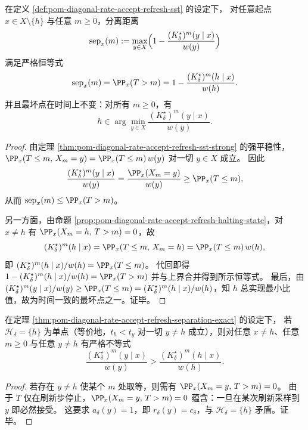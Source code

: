 \begin{theorem}[精确分离距离与时间一致的最坏点]\label{thm:pom-diagonal-rate-accept-refresh-separation-exact}
在定义 \ref{def:pom-diagonal-rate-accept-refresh-sst} 的设定下，
对任意起点 \(x\in X\setminus\{h\}\) 与任意 \(m\ge 0\)，分离距离
\[
\mathrm{sep}_x(m):=\max_{y\in X}\Bigl(1-\frac{(K^\star_\delta)^m(y\mid x)}{w(y)}\Bigr)
\]
满足严格恒等式
\[
\mathrm{sep}_x(m)=\PP_x(T>m)=1-\frac{(K^\star_\delta)^m(h\mid x)}{w(h)}.
\]
并且最坏点在时间上不变：对所有 \(m\ge 0\)，有
\[
h\in\arg\min_{y\in X}\frac{(K^\star_\delta)^m(y\mid x)}{w(y)}.
\]
\end{theorem}
\begin{proof}
由定理 \ref{thm:pom-diagonal-rate-accept-refresh-sst-strong} 的强平稳性，
\(
\PP_x(T\le m,\,X_m=y)=\PP_x(T\le m)\,w(y)
\)
对一切 \(y\in X\) 成立。
因此
\[
\frac{(K^\star_\delta)^m(y\mid x)}{w(y)}
=\frac{\PP_x(X_m=y)}{w(y)}
\ge \PP_x(T\le m),
\]
从而 \(\mathrm{sep}_x(m)\le \PP_x(T>m)\)。
\par
另一方面，由命题 \ref{prop:pom-diagonal-rate-accept-refresh-halting-state}，对 \(x\ne h\) 有
\(\PP_x(X_m=h,\,T>m)=0\)，故
\[
(K^\star_\delta)^m(h\mid x)
=\PP_x(T\le m,\,X_m=h)
=\PP_x(T\le m)\,w(h),
\]
即 \((K^\star_\delta)^m(h\mid x)/w(h)=\PP_x(T\le m)\)。
代回即得
\(
1-(K^\star_\delta)^m(h\mid x)/w(h)=\PP_x(T>m)
\)
并与上界合并得到所示恒等式。
最后，由 \((K^\star_\delta)^m(y\mid x)/w(y)\ge \PP_x(T\le m)=(K^\star_\delta)^m(h\mid x)/w(h)\)，知 \(h\) 总实现最小比值，故为时间一致的最坏点之一。证毕。
\end{proof}

\begin{corollary}[严格分离]\label{cor:pom-diagonal-rate-accept-refresh-separation-strict}
在定理 \ref{thm:pom-diagonal-rate-accept-refresh-separation-exact} 的设定下，
若 \(\mathcal H_\delta=\{h\}\) 为单点（等价地，\(t_h< t_y\) 对一切 \(y\ne h\) 成立），则对任意 \(x\ne h\)、任意 \(m\ge 0\) 与任意 \(y\ne h\) 有严格不等式
\[
\frac{(K^\star_\delta)^m(y\mid x)}{w(y)}>\frac{(K^\star_\delta)^m(h\mid x)}{w(h)}.
\]
\end{corollary}
\begin{proof}
若存在 \(y\ne h\) 使某个 \(m\) 处取等，则需有
\(\PP_x(X_m=y,\,T>m)=0\)。
由于 \(T\) 仅在刷新步停止，\(\PP_x(X_m=y,\,T>m)=0\) 蕴含：一旦在某次刷新采样到 \(y\) 即必然接受。
这要求 \(a_\delta(y)=1\)，即 \(r_\delta(y)=c_\delta\)，与 \(\mathcal H_\delta=\{h\}\) 矛盾。证毕。
\end{proof}

